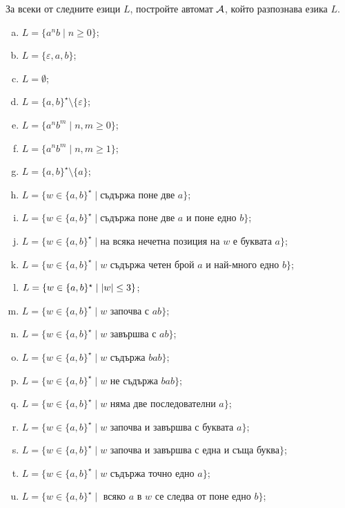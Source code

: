 \begin{problem}
  За всеки от следните езици $L$, постройте автомат $\mathcal{A}$, който разпознава езика $L$.
  \begin{enumerate}[a)]
  \item 
    $L = \{a^nb\mid n \geq 0\}$;
  \item
    $L = \{\varepsilon, a,b\}$;
  \item
    $L = \emptyset$;
  \item
    $L = \{a,b\}^\star\setminus\{\varepsilon\}$;
  \item
    $L = \{a^nb^m\mid n,m \geq 0\}$;
  \item
    $L = \{a^nb^m\mid n,m \geq 1\}$;
  \item
    $L = \{a,b\}^\star \setminus \{a\}$;
  \item
    $L = \{w \in \{a,b\}^\star \mid \mbox{съдържа поне две }a\}$;
  \item
    $L = \{w \in \{a,b\}^\star \mid \mbox{съдържа поне две }a\mbox{ и поне едно }b\}$;
  \item
    $L = \{w \in \{a,b\}^\star \mid \mbox{на всяка нечетна позиция на }w\mbox{ е буквата }a\}$;
  \item
    $L = \{w \in \{a,b\}^\star \mid w\mbox{ съдържа четен брой }a\mbox{ и най-много едно }b\}$;
  \item
    $L = \{w \in \{a,b\}^\star\mid \lvert{w}\rvert \leq 3\}$;
  \item
    $L = \{w \in \{a,b\}^\star \mid w \mbox{ започва с }ab\}$;
  \item
    $L = \{w \in \{a,b\}^\star \mid w \mbox{ завършва с }ab\}$;
  \item
    $L = \{w \in \{a,b\}^\star \mid w \mbox{ съдържа }bab\}$;
  \item
    $L = \{w \in \{a,b\}^\star \mid w \mbox{ не съдържа }bab\}$;
  \item
    $L = \{w \in \{a,b\}^\star \mid w \mbox{ няма две последователни }a\}$;
  \item
    $L = \{w \in \{a,b\}^\star \mid w\mbox{ започва и завършва с буквата } a\}$;
  \item
    $L = \{w \in \{a,b\}^\star \mid w\mbox{ започва и завършва с една и съща буква}\}$;
  \item
    $L = \{w \in \{a,b\}^\star \mid w \mbox{ съдържа точно едно }a\}$;
  \item
    $L = \{w \in \{a,b\}^\star \mid \mbox{ всяко }a\mbox{ в }w\mbox{ се следва от поне едно }b\}$;

\end{enumerate}
\end{problem}
